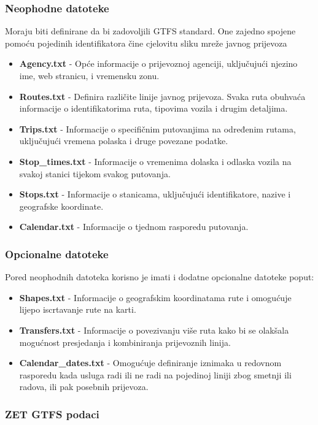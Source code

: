 \documentclass[zavrsnirad]{fer}
\begin{document}
\newpage

\subsubsection{Neophodne datoteke}
Moraju biti definirane da bi zadovoljili GTFS standard. One zajedno spojene pomoću pojedinih identifikatora čine cjelovitu sliku mreže javnog prijevoza
\begin{itemize}
	\item \textbf{Agency.txt} -
	Opće informacije o prijevoznoj agenciji, uključujući njezino ime, web stranicu, i vremensku zonu.
	\item \textbf{Routes.txt} -
	Definira različite linije javnog prijevoza. Svaka ruta obuhvaća informacije o identifikatorima ruta, tipovima vozila i drugim detaljima.
	\item \textbf{Trips.txt} -
	Informacije o specifičnim putovanjima na određenim rutama, uključujući vremena polaska i druge povezane podatke.
	\item \textbf{Stop\_times.txt} -
	Informacije o vremenima dolaska i odlaska vozila na svakoj stanici tijekom svakog putovanja.
	\item \textbf{Stops.txt} -
	Informacije o stanicama, uključujući identifikatore, nazive i geografske koordinate.
	\item \textbf{Calendar.txt} -
	Informacije o tjednom rasporedu putovanja.
\end{itemize}

\subsubsection{Opcionalne datoteke}
Pored neophodnih datoteka korisno je imati i dodatne opcionalne datoteke poput:
\begin{itemize}
	\item \textbf{Shapes.txt} -
	Informacije o geografskim koordinatama rute i omogućuje lijepo iscrtavanje rute na karti.
	\item \textbf{Transfers.txt} -
	Informacije o povezivanju više ruta kako bi se olakšala mogućnost presjedanja i kombiniranja prijevoznih linija.
	\item \textbf{Calendar\_dates.txt} -
	Omogućuje definiranje iznimaka u redovnom rasporedu kada usluga radi ili ne radi na pojedinoj liniji zbog smetnji ili radova, ili pak posebnih prijevoza.
\end{itemize}

\subsubsection{ZET GTFS podaci}
\label{sec:zet-gtfs}
\end{document}
